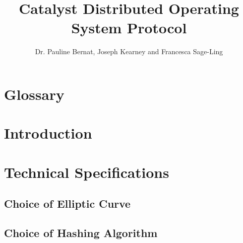 \documentclass[a4paper, 12pt]{article}
\begin{document}
\parindent=0in

\title{Catalyst Distributed Operating System Protocol}
\author{Dr. Pauline Bernat, Joseph Kearney and Francesca Sage-Ling}
\maketitle 


\begin{abstract}

\end{abstract}
 \newpage
 
\tableofcontents

 \newpage
\section*{Glossary} \label{Cha:Glo}




 \newpage
 
\section*{Introduction} \label{Cha:Int}
 

 
 \newpage
 
\section{Technical Specifications} \label{Cha:Tec}



\subsection{Choice of Elliptic Curve}\label{Sec:EC}



\subsection{Choice of Hashing Algorithm}\label{Sec:Has}
\end{document}
